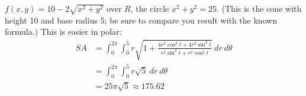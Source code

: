 {$f(x,y) = 10-2\sqrt{x^2+y^2}$ over $R$, the circle $x^2+y^2=25$. (This is the cone with height 10 and base radius 5; be sure to compare you result with the known formula.)
}
{This is easier in polar:
\begin{align*}SA &= \int_{0}^{2\pi}\int_{0}^{5} r\sqrt{1+ \frac{4r^2\cos^2t+4r^2\sin^2t}{r^2\sin^2t+r^2\cos^2t}}\ dr\ d\theta\\
		&= \int_0^{2\pi}\int_0^5r\sqrt{5}\ dr\ d\theta \\
		&= 25\pi\sqrt{5}\approx 175.62
\end{align*}
}